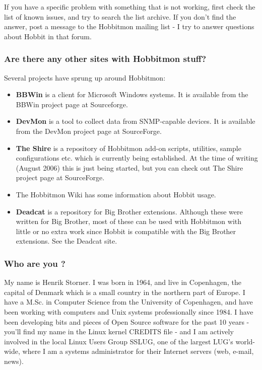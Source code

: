  If you have a specific problem with something that is not working, first check the list of known issues, and try to search the list archive. If you don't find the answer, post a message to the Hobbitmon mailing list - I try to answer questions about Hobbit in that forum.
\subsubsection{Are there any other sites with Hobbitmon stuff?}


 Several projects have sprung up around Hobbitmon:
\begin{itemize}
\item \textbf{BBWin}
 is a client for Microsoft Windows systems. It is available from the BBWin project page at Sourceforge.
\item \textbf{DevMon}
 is a tool to collect data from SNMP-capable devices. It is available from the DevMon project page at SourceForge.
\item \textbf{The Shire}
 is a repository of Hobbitmon add-on scripts, utilities, sample configurations etc. which is currently being established. At the time of writing (August 2006) this is just being started, but you can check out The Shire project page at SourceForge.
\item The Hobbitmon Wiki has some information about Hobbit usage.
\item \textbf{Deadcat}
 is a repository for Big Brother extensions. Although these were written for Big Brother, most of these can be used with Hobbitmon with little or no extra work since Hobbit is compatible with the Big Brother extensions. See the Deadcat site.

\end{itemize}
\subsubsection{Who are you ?}


 My name is Henrik Storner. I was born in 1964, and live in Copenhagen, the capital of Denmark which is a small country in the northern part of Europe. I have a M.Sc. in Computer Science from the University of Copenhagen, and have been working with computers and Unix systems professionally since 1984. I have been developing bits and pieces of Open Source software for the past 10 years - you'll find my name in the Linux kernel CREDITS file - and I am actively involved in the local Linux Users Group SSLUG, one of the largest LUG's world-wide, where I am a systems administrator for their Internet servers (web, e-mail, news).


